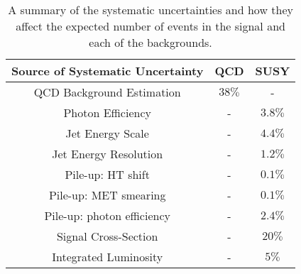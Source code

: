 \begin{table}
\begin{center}
\begin{tabular}{|c|c|c|}
\hline
{\bf Source of Systematic Uncertainty} & {\bf QCD} & {\bf SUSY} \\
\hline
QCD Background Estimation & $38\unit{\%}$ & - \\
\hline
Photon Efficiency & - & $3.8\unit{\%}$ \\
\hline
Jet Energy Scale & - & $4.4\unit{\%}$ \\
\hline
Jet Energy Resolution & - & $1.2\unit{\%}$ \\
\hline
Pile-up: HT shift & - & $0.1\unit{\%}$ \\
\hline
Pile-up: MET smearing & - & $0.1\unit{\%}$ \\
\hline
Pile-up: photon efficiency & - & $2.4\unit{\%}$ \\
\hline
Signal Cross-Section & - & $20\unit{\%}$ \\
\hline
Integrated Luminosity & - & $5\unit{\%}$ \\
\hline
\end{tabular}
\end{center}
\caption{A summary of the systematic uncertainties and how they affect the
expected number of events in the signal and each of the backgrounds.}
\label{tab:Systematics_Summary}
\end{table}
